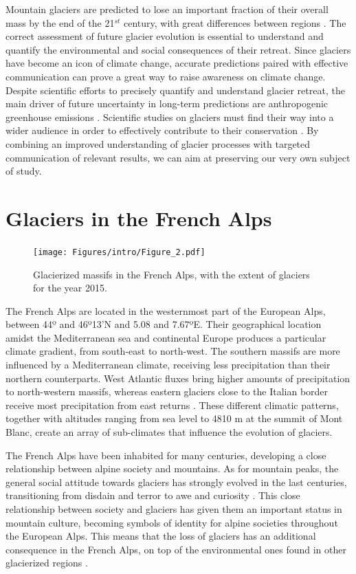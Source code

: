 Mountain glaciers are predicted to lose an important fraction of their overall mass by the end of the 21$^{st}$ century, with great differences between regions \citep{hock_glaciermip_2019}. The correct assessment of future glacier evolution is essential to understand and quantify the environmental and social consequences of their retreat. Since glaciers have become an icon of climate change, accurate predictions paired with effective communication can prove a great way to raise awareness on climate change. Despite scientific efforts to precisely quantify and understand glacier retreat, the main driver of future uncertainty in long-term predictions are anthropogenic greenhouse emissions \citep{marzeion_partitioning_2020}. Scientific studies on glaciers must find their way into a wider audience in order to effectively contribute to their conservation \citep{moser_communicating_2010}. By combining an improved understanding of glacier processes with targeted communication of relevant results, we can aim at preserving our very own subject of study.  

\section{Glaciers in the French Alps}

\begin{figure}
\centering
\texttt{[image: Figures/intro/Figure\_2.pdf]}
\caption{Glacierized massifs in the French Alps, with the extent of glaciers for the year 2015.}
\label{intro:fig2}
\end{figure}

The French Alps are located in the westernmost part of the European Alps, between 44º and 46º13'N and 5.08 and 7.67ºE. Their geographical location amidst the Mediterranean sea and continental Europe produces a particular climate gradient, from south-east to north-west. The southern massifs are more influenced by a Mediterranean climate, receiving less precipitation than their northern counterparts. West Atlantic fluxes bring higher amounts of precipitation to north-western massifs, whereas eastern glaciers close to the Italian border receive most precipitation from east returns \citep{durand_reanalysis_2009}. These different climatic patterns, together with altitudes ranging from sea level to 4810 m at the summit of Mont Blanc, create an array of sub-climates that influence the evolution of glaciers. 

The French Alps have been inhabited for many centuries, developing a close relationship between alpine society and mountains. As for mountain peaks, the general social attitude towards glaciers has strongly evolved in the last centuries, transitioning from disdain and terror to awe and curiosity \citep{zryd_les_2008}. This close relationship between society and glaciers has given them an important status in mountain culture, becoming symbols of identity for alpine societies throughout the European Alps. This means that the loss of glaciers has an additional consequence in the French Alps, on top of the environmental ones found in other glacierized regions \citep{smit_exploring_2019}. 

